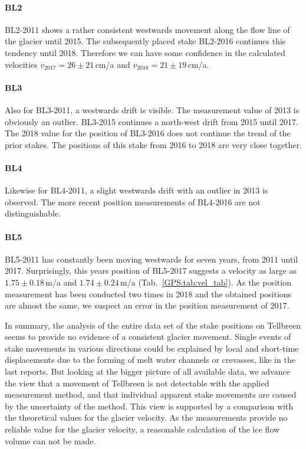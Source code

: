 \paragraph{BL2}
BL2-2011 shows a rather consistent westwards movement along the flow line of the glacier until 2015.
The subsequently placed stake BL2-2016 continues this tendency until 2018.
Therefore we can have some confidence in the calculated velocities
\mbox{$v_{2017} = 26 \pm 21\,$cm/a} and \mbox{$v_{2016} = 21 \pm 19\,$cm/a}.

\paragraph{BL3}
Also for BL3-2011, a westwards drift is visible.
The measurement value of 2013 is obviously an outlier.
BL3-2015 continues a north-west drift from 2015 until 2017.
The 2018 value for the position of BL3-2016 does not continue the trend of the prior stakes.
The positions of this stake from 2016 to 2018 are very close together.

\paragraph{BL4}
Likewise for BL4-2011, a slight westwards drift with an outlier in 2013 is observed.
The more recent position measurements of BL4-2016 are not distinguishable.

\paragraph{BL5}
BL5-2011 has constantly been moving westwards for seven years, from 2011 until 2017.
Surprisingly, this years position of BL5-2017 suggests a velocity as large as
$1.75 \pm 0.18\,$m/a and $1.74 \pm 0.24\,$m/a (Tab.~\ref{GPS:tab:vel_tab}).
As the position measurement has been conducted two times in 2018 and the obtained positions are almost the same,
we suspect an error in the position measurement of 2017.
\bigskip

In summary, the analysis of the entire data set of the stake positions on Tellbreen seems to provide
no evidence of a consistent glacier movement.
Single events of stake movements in various directions
could be explained by local and short-time displacements due to the forming
of melt water channels or crevasses, like in the last reports.
But looking at the bigger picture of all available data,
we advance the view that a movement of Tellbreen is not detectable with the applied measurement method,
and that individual apparent stake movements are caused by the uncertainty of the method.
This view is supported by a comparison with the theoretical values for the glacier velocity.
As the measurements provide no reliable value for the glacier velocity,
a reasonable calculation of the ice flow volume can not be made.

